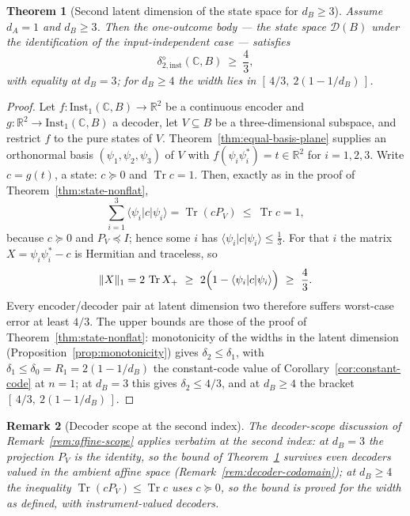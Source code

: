\documentclass[11pt,a4paper]{article}
\newtheorem{theorem}{Theorem}[section]
\newtheorem{remark}[theorem]{Remark}
\newcommand{\Inst}{\mathrm{Inst}}
\newcommand{\Tr}{\operatorname{Tr}}
\begin{document}
\begin{theorem}[Second latent dimension of the state space for $d_B\ge3$]
\label{thm:state-d2}
Assume $d_A=1$ and $d_B\ge3$. Then the one-outcome body --- the state space
$\mathcal D(B)$ under the identification of the input-independent case ---
satisfies
\[
\delta_{2,\mathrm{inst}}^{\diamond}(\mathbb C,B)\ \ge\ \frac43,
\]
with equality at $d_B=3$; for $d_B\ge4$ the width lies in
$[\,4/3,\ 2(1-1/d_B)\,]$.
\end{theorem}

\begin{proof}
Let $f\colon\Inst_1(\mathbb C,B)\to\mathbb R^2$ be a continuous encoder and
$g\colon\mathbb R^2\to\Inst_1(\mathbb C,B)$ a decoder, let $V\subseteq B$ be
a three-dimensional subspace, and restrict $f$ to the pure states of $V$.
Theorem~\ref{thm:equal-basis-plane} supplies an orthonormal basis
$(\psi_1,\psi_2,\psi_3)$ of $V$ with $f(\psi_i\psi_i^*)=t\in\mathbb R^2$ for
$i=1,2,3$. Write $c=g(t)$, a state: $c\succeq0$ and $\Tr c=1$. Then, exactly
as in the proof of Theorem~\ref{thm:state-nonflat},
\[
\sum_{i=1}^3\langle\psi_i|c|\psi_i\rangle
=\Tr(cP_V)\ \le\ \Tr c=1,
\]
because $c\succeq0$ and $P_V\preceq I$; hence some $i$ has
$\langle\psi_i|c|\psi_i\rangle\le\tfrac13$. For that $i$ the matrix
$X=\psi_i\psi_i^*-c$ is Hermitian and traceless, so
\[
\|X\|_1=2\,\Tr X_+\ \ge\ 2\Bigl(1-\langle\psi_i|c|\psi_i\rangle\Bigr)
\ \ge\ \frac43.
\]
Every encoder/decoder pair at latent dimension two therefore suffers
worst-case error at least $4/3$. The upper bounds are those of the proof of
Theorem~\ref{thm:state-nonflat}: monotonicity of the widths in the latent
dimension (Proposition~\ref{prop:monotonicity}) gives $\delta_2\le\delta_1$,
with $\delta_1\le\delta_0=R_1=2(1-1/d_B)$ the constant-code value of
Corollary~\ref{cor:constant-code} at $n=1$; at $d_B=3$ this gives
$\delta_2\le4/3$, and at $d_B\ge4$ the bracket $[\,4/3,\ 2(1-1/d_B)\,]$.
\end{proof}

\begin{remark}[Decoder scope at the second index]
\label{rem:affine-scope-2}
The decoder-scope discussion of Remark~\ref{rem:affine-scope} applies
verbatim at the second index: at $d_B=3$ the projection $P_V$ is the
identity, so the bound of Theorem~\ref{thm:state-d2} survives even decoders
valued in the ambient affine space (Remark~\ref{rem:decoder-codomain}); at
$d_B\ge4$ the inequality $\Tr(cP_V)\le\Tr c$ uses $c\succeq0$, so the bound
is proved for the width as defined, with instrument-valued decoders.
\end{remark}
\end{document}
